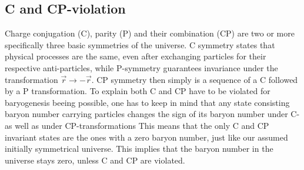 \subsection{C and CP-violation}
Charge conjugation (C), parity (P) and their combination (CP) are two or more specifically three basic symmetries of the universe. C symmetry states that physical processes are the same, even after exchanging particles for their respective anti-particles, while P-symmetry guarantees invariance under the transformation $\vec{r}\rightarrow-\vec{r}$. CP symmetry then simply is a sequence of a C followed by a P transformation. \newline\indent \indent
To explain both C and CP have to be violated for baryogenesis beeing possible, one has to keep in mind that any state consisting baryon number carrying particles changes the sign of its baryon number under C- as well as under CP-transformations\cite[p. 4]{Petropoulos:2003pm} This means that the only C and CP invariant states are the ones with a zero baryon number, just like our assumed initially symmetrical universe.
This implies that the baryon number in the universe stays zero, unless C and CP are violated\cite[p. 4]{Petropoulos:2003pm}. \newline \indent
